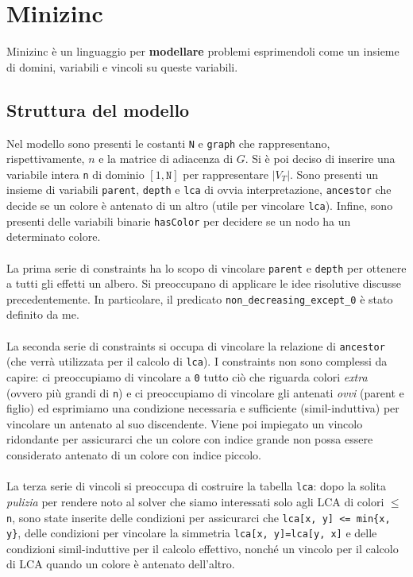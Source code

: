 \documentclass{report}
\begin{document}
\chapter{Minizinc}

Minizinc è un linguaggio per \textbf{modellare} problemi esprimendoli come un insieme di domini, variabili e vincoli su queste variabili.

\section{Struttura del modello}

Nel modello sono presenti le costanti \texttt{N} e \texttt{graph} che rappresentano, rispettivamente, $n$ e la matrice di adiacenza di $G$. Si è poi
deciso di inserire una variabile intera \texttt{n} di dominio $[1, \texttt{N}]$ per rappresentare $|V_T|$. Sono presenti un insieme di variabili
\texttt{parent}, \texttt{depth} e \texttt{lca} di ovvia interpretazione, \texttt{ancestor} che decide se un colore è antenato di un altro (utile per vincolare
\texttt{lca}). Infine, sono presenti delle variabili binarie \texttt{hasColor} per decidere se un nodo ha un determinato colore.
\ \\
\ \\

La prima serie di constraints ha lo scopo di vincolare \texttt{parent} e \texttt{depth} per ottenere a tutti gli effetti un albero. Si preoccupano di applicare le idee
risolutive discusse precedentemente. In particolare, il predicato \texttt{non\_decreasing\_except\_0} è stato definito da me.
\ \\
\ \\

La seconda serie di constraints si occupa di vincolare la relazione di \texttt{ancestor} (che verrà utilizzata per il calcolo di \texttt{lca}). I constraints non sono complessi
da capire: ci preoccupiamo di vincolare a \texttt{0} tutto ciò che riguarda colori \textit{extra} (ovvero più grandi di \texttt{n}) e ci preoccupiamo di vincolare gli antenati
\textit{ovvi} (parent e figlio) ed esprimiamo una condizione necessaria e sufficiente (simil-induttiva) per vincolare un antenato al suo discendente. Viene poi impiegato un
vincolo ridondante per assicurarci che un colore con indice grande non possa essere considerato antenato di un colore con indice piccolo.
\ \\
\ \\

La terza serie di vincoli si preoccupa di costruire la tabella \texttt{lca}: dopo la solita \textit{pulizia} per rendere noto al solver che siamo interessati solo agli LCA di
colori $\leq$\texttt{n}, sono state inserite delle condizioni per assicurarci che \texttt{lca[x, y] <= min\{x, y\}}, delle condizioni per vincolare la simmetria
\texttt{lca[x, y]=lca[y, x]} e delle condizioni simil-induttive per il calcolo effettivo, nonché un vincolo per il calcolo di LCA quando un colore è antenato dell'altro.
\ \\
\ \\
\end{document}
